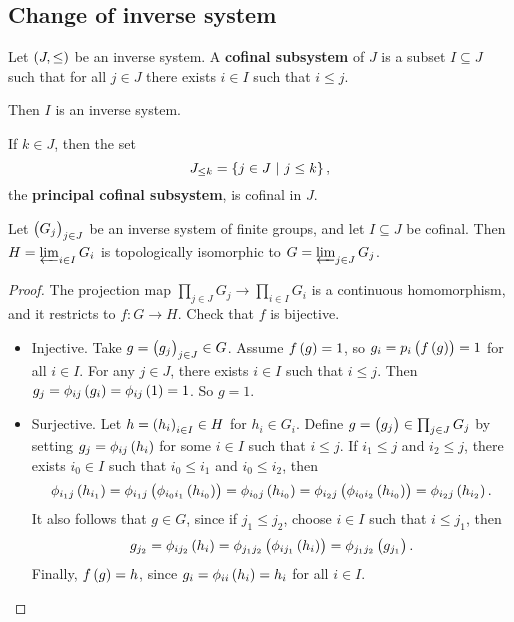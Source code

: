 \subsection{Change of inverse system}

\begin{definition}
Let $ \br{J, \le} $ be an inverse system. A \textbf{cofinal subsystem} of $ J $ is a subset $ I \subseteq J $ such that for all $ j \in J $ there exists $ i \in I $ such that $ i \le j $.
\end{definition}

Then $ I $ is an inverse system.

\begin{example}
If $ k \in J $, then the set
$$ J_{\le k} = \cbr{j \in J \st j \le k}, $$
the \textbf{principal cofinal subsystem}, is cofinal in $ J $.
\end{example}

\begin{proposition}
Let $ \br{G_j}_{j \in J} $ be an inverse system of finite groups, and let $ I \subseteq J $ be cofinal. Then $ H = \varprojlim_{i \in I} G_i $ is topologically isomorphic to $ G = \varprojlim_{j \in J} G_j $.
\end{proposition}

\begin{proof}
The projection map $ \prod_{j \in J} G_j \to \prod_{i \in I} G_i $ is a continuous homomorphism, and it restricts to $ f : G \to H $. Check that $ f $ is bijective.
\begin{itemize}
\item Injective. Take $ g = \br{g_j}_{j \in J} \in G $. Assume $ f\br{g} = 1 $, so $ g_i = p_i\br{f\br{g}} = 1 $ for all $ i \in I $. For any $ j \in J $, there exists $ i \in I $ such that $ i \le j $. Then $ g_j = \phi_{ij}\br{g_i} = \phi_{ij}\br{1} = 1 $. So $ g = 1 $.
\item Surjective. Let $ h = \br{h_i}_{i \in I} \in H $ for $ h_i \in G_i $. Define $ g = \br{g_j} \in \prod_{j \in J} G_j $ by setting $ g_j = \phi_{ij}\br{h_i} $ for some $ i \in I $ such that $ i \le j $. If $ i_1 \le j $ and $ i_2 \le j $, there exists $ i_0 \in I $ such that $ i_0 \le i_1 $ and $ i_0 \le i_2 $, then
$$ \phi_{i_1j}\br{h_{i_1}} = \phi_{i_1j}\br{\phi_{i_0i_1}\br{h_{i_0}}} = \phi_{i_0j}\br{h_{i_0}} = \phi_{i_2j}\br{\phi_{i_0i_2}\br{h_{i_0}}} = \phi_{i_2j}\br{h_{i_2}}. $$
It also follows that $ g \in G $, since if $ j_1 \le j_2 $, choose $ i \in I $ such that $ i \le j_1 $, then
$$ g_{j_2} = \phi_{ij_2}\br{h_i} = \phi_{j_1j_2}\br{\phi_{ij_1}\br{h_i}} = \phi_{j_1j_2}\br{g_{j_1}}. $$
Finally, $ f\br{g} = h $, since $ g_i = \phi_{ii}\br{h_i} = h_i $ for all $ i \in I $.
\end{itemize}
\end{proof}

